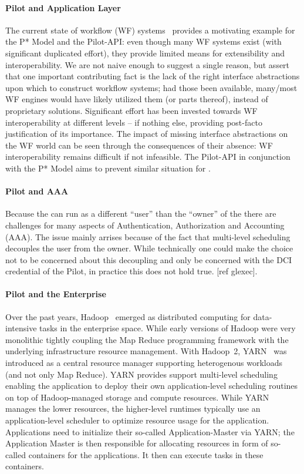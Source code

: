 \documentclass{sig-alternate}
\begin{document}
\paragraph*{Pilot and Application Layer} The current state of workflow
(WF) systems~\cite{nsf-workflow,1196459} provides a motivating example
for the P* Model and the Pilot-API: even though many WF systems exist
(with significant duplicated effort), they provide limited means for
extensibility and interoperability.  We are not naive enough to suggest
a single reason, but assert that one important contributing fact is the
lack of the right interface abstractions upon which to construct
workflow systems; had those been available, many/most WF engines would
have likely utilized them (or parts thereof), instead of proprietary
solutions. Significant effort has been invested towards WF
interoperability at different levels -- if nothing else, providing
post-facto justification of its importance. The impact of missing
interface abstractions on the WF world can be seen through the
consequences of their absence: WF interoperability remains difficult if
not infeasible. The Pilot-API in conjunction with the P* Model aims to
prevent similar situation for \pilotjobs.

\paragraph*{Pilot and AAA} Because the \pilot can run as a different ``user''
than the ``owner'' of the  there are challenges for many aspects of
Authentication, Authorization and Accounting (AAA).
The issue mainly arrises because of the fact that multi-level scheduling
decouples the  user from the  owner.
While technically one could make the choice not to be concerned about this
decoupling and only be concerned with the DCI credential of the Pilot, in
practice this does not hold true.
[ref glexec].

\paragraph*{Pilot and the Enterprise} Over the past years,
Hadoop~\cite{hadoop} emerged as distributed computing for data-intensive
tasks in the enterprise space. While early versions of Hadoop were very
monolithic tightly coupling the Map Reduce programming framework with
the underlying infrastructure resource management. With Hadoop~2,
YARN~\cite{yarn-paper} was introduced as a central resource manager
supporting heterogenous workloads (and not only Map Reduce). YARN
provides support multi-level scheduling enabling the application to
deploy their own application-level scheduling routines on top of
Hadoop-managed storage and compute resources. While YARN manages the
lower resources, the higher-level runtimes typically use an
application-level scheduler to optimize resource usage for the
application. Applications need to initialize their so-called
Application-Master via YARN; the Application Master is then responsible
for allocating resources in form of so-called containers for the
applications. It then can execute tasks in these containers.
\end{document}
